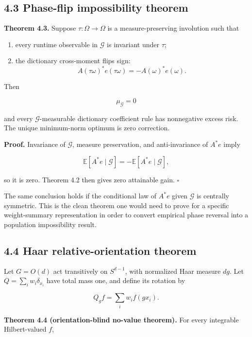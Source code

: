 \documentclass[
  10pt,
]{article}
\providecommand{\tightlist}{%
  \setlength{\itemsep}{0pt}\setlength{\parskip}{0pt}}
\begin{document}
\subsection{4.3 Phase-flip impossibility
theorem}\label{phase-flip-impossibility-theorem}

\textbf{Theorem 4.3.} Suppose \(\tau:\Omega\to\Omega\) is a
measure-preserving involution such that

\begin{enumerate}
\def\labelenumi{\arabic{enumi}.}
\tightlist
\item
  every runtime observable in \(\mathcal G\) is invariant under
  \(\tau\);
\item
  the dictionary cross-moment flips sign: \[
  A(\tau\omega)^*e(\tau\omega)
  =-A(\omega)^*e(\omega).
  \]
\end{enumerate}

Then

\[
\mu_{\mathcal G}=0
\]

and every \(\mathcal G\)-measurable dictionary coefficient rule has
nonnegative excess risk. The unique minimum-norm optimum is zero
correction.

\textbf{Proof.} Invariance of \(\mathcal G\), measure preservation, and
anti-invariance of \(A^*e\) imply

\[
\mathbb E[A^*e\mid\mathcal G]
=
-\mathbb E[A^*e\mid\mathcal G],
\]

so it is zero. Theorem 4.2 then gives zero attainable gain. \(\square\)

The same conclusion holds if the conditional law of \(A^*e\) given
\(\mathcal G\) is centrally symmetric. This is the clean theorem one
would need to prove for a specific weight-summary representation in
order to convert empirical phase reversal into a population
impossibility result.

\subsection{4.4 Haar relative-orientation
theorem}\label{haar-relative-orientation-theorem}

Let \(G=O(d)\) act transitively on \(S^{d-1}\), with normalized Haar
measure \(dg\). Let \(Q=\sum_iw_i\delta_{x_i}\) have total mass one, and
define its rotation by

\[
Q_gf=\sum_iw_i f(gx_i).
\]

\textbf{Theorem 4.4 (orientation-blind no-value theorem).} For every
integrable Hilbert-valued \(f\),
\end{document}
